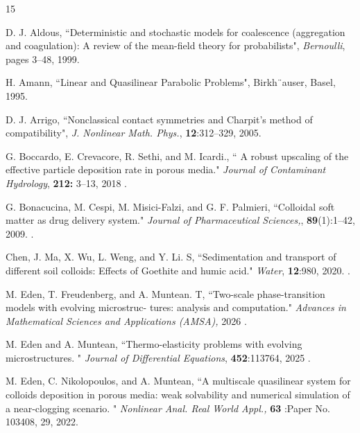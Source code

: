 \documentclass[reqno, 11pt]{amsart}
\numberwithin{equation}{section}
\begin{document}
\begin{thebibliography}{15} 

\newblock D. J. Aldous,
\newblock  ``Deterministic and stochastic models for coalescence (aggregation and coagulation): A review
of the mean-field theory for probabilists",
\newblock   \emph{Bernoulli},   pages 3–48, 1999.

\newblock H. Amann,
\newblock  ``Linear and Quasilinear Parabolic Problems",
\newblock  Birkh¨auser, Basel, 1995.

\newblock D. J. Arrigo,
\newblock ``Nonclassical contact symmetries and Charpit’s method of compatibility",
\emph{ J. Nonlinear Math. Phys.}, \textbf{12}:312–329, 2005.

\newblock G. Boccardo, E. Crevacore, R. Sethi, and M. Icardi.,
\newblock  `` A robust upscaling of the effective particle deposition
rate in porous media."
\newblock   \emph{Journal of Contaminant Hydrology},  \textbf{212:} 3–13, 2018 .

\newblock G. Bonacucina, M. Cespi, M. Misici-Falzi, and G. F. Palmieri,
\newblock ``Colloidal soft matter as drug delivery system."
\newblock   \emph{Journal of Pharmaceutical Sciences,},  \textbf{89}(1):1–42, 2009. .

\newblock  Chen, J. Ma, X. Wu, L. Weng, and Y. Li. S,
\newblock  ``Sedimentation and transport of different soil colloids: Effects
of Goethite and humic acid."
\newblock   \emph{Water},  \textbf{12}:980, 2020. .


\newblock M. Eden, T. Freudenberg, and A. Muntean. T,
\newblock  ``Two-scale phase-transition models with evolving microstruc-
tures: analysis and computation."
\newblock   \emph{Advances in Mathematical Sciences and Applications (AMSA),}  \textbf{}2026 .


\newblock M. Eden and A. Muntean,
\newblock  ``Thermo-elasticity problems with evolving microstructures. "
\newblock   \emph{Journal of Differential
Equations},  \textbf{452}:113764, 2025 .


\newblock M. Eden, C. Nikolopoulos, and A. Muntean,
\newblock ``A  multiscale quasilinear system for colloids deposition in
porous media: weak solvability and numerical simulation of a near-clogging scenario. "
\newblock   \emph{Nonlinear Anal. Real
World Appl., }  \textbf{63} :Paper No. 103408, 29, 2022.


\end{thebibliography}
\end{document}
